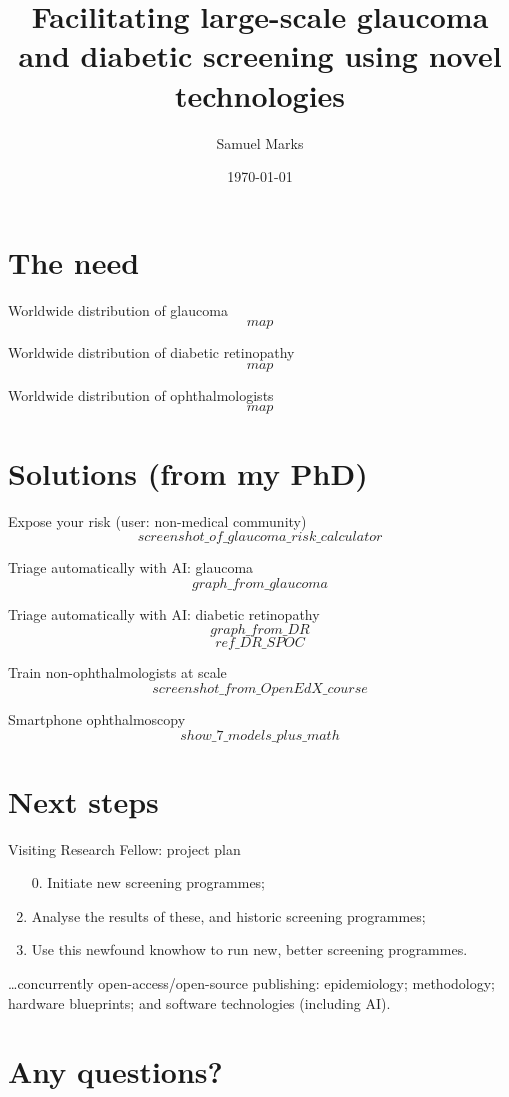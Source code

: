 \documentclass{beamer}
\title{Facilitating large-scale glaucoma and diabetic screening using novel technologies}
\date{\today}
\author{Samuel Marks}
\institute{Visiting Research Fellow at Harvard Medical School / Mass Eye and Ear}
\begin{document}
  \maketitle

  \section{The need}
  \begin{frame}{Worldwide distribution of glaucoma}
    \[map\]
  \end{frame}
  \begin{frame}{Worldwide distribution of diabetic retinopathy}
    \[map\]
  \end{frame}
  \begin{frame}{Worldwide distribution of ophthalmologists}
    \[map\]
  \end{frame}

  \section{Solutions (from my PhD)}
  \begin{frame}{Expose your risk (user: non-medical community)}
    \[screenshot\_of\_glaucoma\_risk\_calculator\]
  \end{frame}

  \begin{frame}{Triage automatically with AI: glaucoma}
    \[graph\_from\_glaucoma\]
  \end{frame}

  \begin{frame}{Triage automatically with AI: diabetic retinopathy}
    \[graph\_from\_DR\]
    \[ref\_DR\_SPOC\]
  \end{frame}

  \begin{frame}{Train non-ophthalmologists at scale}
    \[screenshot\_from\_OpenEdX\_course\]
  \end{frame}

  \begin{frame}{Smartphone ophthalmoscopy}
    \[show\_7\_models\_plus\_math\]
  \end{frame}

  \section{Next steps}
  \begin{frame}{Visiting Research Fellow: project plan}
    \begin{enumerate}
      \item[0.] Initiate new screening programmes;
      \item Analyse the results of these, and historic screening programmes;  
      \item Use this newfound knowhow to run new, better screening programmes.
    \end{enumerate}

    \ldots{}concurrently open-access/open-source publishing: epidemiology; methodology; hardware blueprints; and software technologies (including AI).
  \end{frame}

  \section{Any questions?}
\end{document}
